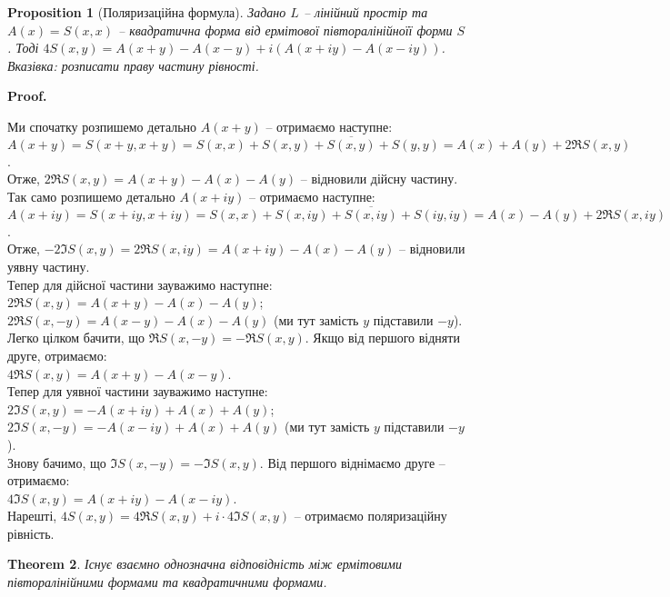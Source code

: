 \documentclass[a4paper, 10pt]{article}
\makeatletter
\theoremstyle{theoremdd}
\newtheorem{theorem}{Theorem}[subsection]
\newtheorem{proposition}[theorem]{Proposition}
\renewenvironment{proof}[1][Proof.\\]{\par
\pushQED{\hfill \qed}%
\normalfont \topsep6\p@\@plus6\p@\relax
\trivlist
\item\relax
{\bfseries
#1\@addpunct{.}}\hspace\labelsep\ignorespaces
}{%
\popQED\endtrivlist\@endpefalse
}
\makeatother
\begin{document}
\begin{proposition}[Поляризаційна формула]
Задано $L$ -- лінійний простір та $A(x) = S(x,x)$ -- квадратична форма від ермітової півторалінійноїї форми $S$. Тоді $4S(x,y) = A(x+y) - A(x-y) + i(A(x+iy) - A(x-iy))$.\\
\textit{Вказівка: розписати праву частину рівності.}
\end{proposition}

\begin{proof}
Ми спочатку розпишемо детально $A(x+y)$ -- отримаємо наступне:\\
$A(x+y) = S(x+y,x+y) = S(x,x) + S(x,y) + \overline{S(x,y)} + S(y,y) = A(x) + A(y) + 2 \Re S(x,y)$.\\
Отже, $2 \Re S(x,y) = A(x+y) - A(x) - A(y)$ -- відновили дійсну частину.\\
Так само розпишемо детально $A(x+iy)$ -- отримаємо наступне:\\
$A(x+iy) = S(x+iy,x+iy) = S(x,x) + S(x,iy) + \overline{S(x,iy)} + S(iy,iy) = A(x) - A(y) + 2 \Re S(x,iy)$.\\
Отже, $-2 \Im S(x,y) = 2 \Re S(x,iy) = A(x+iy) - A(x) - A(y)$ -- відновили уявну частину.\\
Тепер для дійсної частини зауважимо наступне:\\
$2 \Re S(x,y) = A(x+y) - A(x) - A(y)$;\\
$2 \Re S(x,-y) = A(x-y) - A(x) - A(y)$ (ми тут замість $y$ підставили $-y$).\\
Легко цілком бачити, що $\Re S(x,-y) = - \Re S(x,y)$. Якщо від першого відняти друге, отримаємо:\\
$4 \Re S(x,y) = A(x+y) - A(x-y)$.\\
Тепер для уявної частини зауважимо наступне:\\
$2 \Im S(x,y) = -A(x+iy) + A(x) + A(y)$;\\
$2 \Im S(x,-y) = -A(x-iy) + A(x) + A(y)$ (ми тут замість $y$ підставили $-y$).\\
Знову бачимо, що $\Im S(x,-y) = - \Im S(x,y)$. Від першого віднімаємо друге -- отримаємо:\\
$4 \Im S(x,y) = A(x+iy) - A(x-iy)$.\\
Нарешті, $4S(x,y) = 4 \Re S(x,y) + i \cdot 4 \Im S(x,y)$ -- отримаємо поляризаційну рівність.
\end{proof}

\begin{theorem}
Існує взаємно однозначна відповідність між ермітовими півторалінійними формами та квадратичними формами.
\end{theorem}
\end{document}
